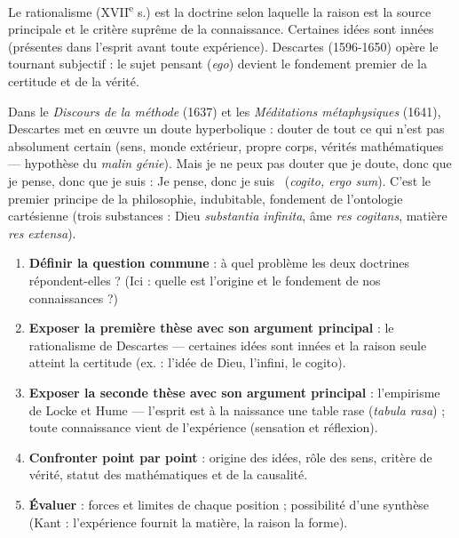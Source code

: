\documentclass[11pt]{article}
\newcommand{\cle}[1]{{\popxbold\color{popdark}#1}}
\begin{document}
\begin{definition}
Le \cle{rationalisme} (XVII\textsuperscript{e} s.) est la doctrine selon laquelle la raison est la source principale et le critère suprême de la connaissance. Certaines idées sont \cle{innées} (présentes dans l'esprit avant toute expérience). Descartes (1596-1650) opère le \cle{tournant subjectif} : le sujet pensant (\emph{ego}) devient le fondement premier de la certitude et de la vérité.
\end{definition}

\begin{propriete}
Dans le \emph{Discours de la méthode} (1637) et les \emph{Méditations métaphysiques} (1641), Descartes met en œuvre un \cle{doute hyperbolique} : douter de tout ce qui n'est pas absolument certain (sens, monde extérieur, propre corps, vérités mathématiques — hypothèse du \emph{malin génie}). Mais je ne peux pas douter que je doute, donc que je pense, donc que je suis : \guillemotleft Je pense, donc je suis \guillemotright\ (\emph{cogito, ergo sum}). C'est le premier principe de la philosophie, indubitable, fondement de l'\cle{ontologie} cartésienne (trois substances : Dieu \emph{substantia infinita}, âme \emph{res cogitans}, matière \emph{res extensa}).
\end{propriete}

\begin{methode}
\begin{enumerate}
\item \textbf{Définir la question commune} : à quel problème les deux doctrines répondent-elles ? (Ici : quelle est l'origine et le fondement de nos connaissances ?)
\item \textbf{Exposer la première thèse avec son argument principal} : le rationalisme de Descartes — certaines idées sont innées et la raison seule atteint la certitude (ex. : l'idée de Dieu, l'infini, le cogito).
\item \textbf{Exposer la seconde thèse avec son argument principal} : l'empirisme de Locke et Hume — l'esprit est à la naissance une \cle{table rase} (\emph{tabula rasa}) ; toute connaissance vient de l'expérience (sensation et réflexion).
\item \textbf{Confronter point par point} : origine des idées, rôle des sens, critère de vérité, statut des mathématiques et de la causalité.
\item \textbf{Évaluer} : forces et limites de chaque position ; possibilité d'une synthèse (Kant : l'expérience fournit la matière, la raison la forme).
\end{enumerate}
\end{methode}
\end{document}
